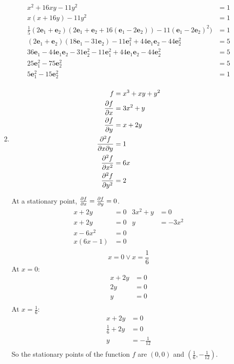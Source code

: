 \documentclass[10pt,oneside,a4paper]{article}
\begin{document}
\begin{enumerate}
\[
\begin{split}
x^2 + 16xy - 11y^2 &= 1 \\
x(x + 16y) - 11y^2 &= 1 \\
\frac{1}{5}(2\mathbf{e}_1 + \mathbf{e}_2)(2\mathbf{e}_1 + \mathbf{e}_2 + 16(\mathbf{e}_1 - 2\mathbf{e}_2)) - 11
(\mathbf{e}_1 - 2\mathbf{e}_2)^2) &= 1 \\
(2\mathbf{e}_1 + \mathbf{e}_2)(18\mathbf{e}_1 - 31\mathbf{e}_2) - 11\mathbf{e}_1^2 +
44\mathbf{e}_1\mathbf{e}_2 - 44\mathbf{e}_2^2 &= 5 \\
36\mathbf{e}_1 - 44\mathbf{e}_1\mathbf{e}_2 - 31\mathbf{e}_2^2 - 11\mathbf{e}_1^2 +
44\mathbf{e}_1\mathbf{e}_2 - 44\mathbf{e}_2^2 &= 5 \\
25\mathbf{e}_1^2 - 75\mathbf{e}_2^2 &= 5 \\
5\mathbf{e}_1^2 - 15\mathbf{e}_2^2 &= 1 \\
\end{split}
\]

\item

\[
\begin{split}
f &= x^3 + xy + y^2 \\
\pdv{f}{x} &= 3x^2 + y \\
\pdv{f}{y} &= x + 2y \\
\pdv[2]{f}{x}{y} &= 1 \\
\pdv[2]{f}{x} &= 6x \\
\pdv[2]{f}{y} &= 2 \\
\end{split}
\]

At a stationary point, $\pdv{f}{x} = \pdv{f}{y} = 0$.
\begin{align}
x + 2y &= 0 & 3x^2 + y &= 0 \\
x + 2y &= 0 & y &= -3x^2 \\
x - 6x^2 &= 0 \\
x(6x - 1) &= 0 \\
\end{align}
\[
x = 0 \vee x = \frac{1}{6}
\]
At $x = 0$:
\[
\begin{split}
x + 2y &= 0 \\
2y &= 0 \\
y &= 0 \\
\end{split}
\]
At $x = \frac{1}{6}$:
\[
\begin{split}
x + 2y &= 0 \\
\frac{1}{6} + 2y &= 0 \\
y &= -\frac{1}{12} \\
\end{split}
\]
So the stationary points of the function $f$ are $\left( 0, 0 \right)$ and $\left( \frac{1}{6}, -\frac{1}{12} \right)$.


\end{enumerate}
\end{document}

